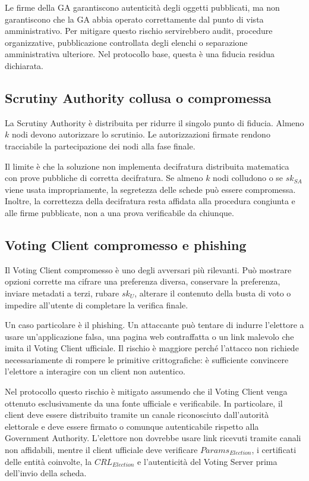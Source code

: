 \documentclass[a4paper,12pt]{article}
\begin{document}
Le firme della GA garantiscono autenticità degli oggetti pubblicati, ma non garantiscono che la GA abbia operato correttamente dal punto di vista amministrativo.
Per mitigare questo rischio servirebbero audit, procedure organizzative, pubblicazione controllata degli elenchi o separazione amministrativa ulteriore.
Nel protocollo base, questa è una fiducia residua dichiarata.

\subsection{Scrutiny Authority collusa o compromessa}

La Scrutiny Authority è distribuita per ridurre il singolo punto di fiducia.
Almeno \(k\) nodi devono autorizzare lo scrutinio.
Le autorizzazioni firmate rendono tracciabile la partecipazione dei nodi alla fase finale.

Il limite è che la soluzione non implementa decifratura distribuita matematica con prove pubbliche di corretta decifratura.
Se almeno \(k\) nodi colludono o se \(sk_{SA}\) viene usata impropriamente, la segretezza delle schede può essere compromessa.
Inoltre, la correttezza della decifratura resta affidata alla procedura congiunta e alle firme pubblicate, non a una prova verificabile da chiunque.

\subsection{Voting Client compromesso e phishing}

Il Voting Client compromesso è uno degli avversari più rilevanti.
Può mostrare opzioni corrette ma cifrare una preferenza diversa, conservare la preferenza, inviare metadati a terzi, rubare \(sk_U\), alterare il contenuto della busta di voto o impedire all'utente di completare la verifica finale.

Un caso particolare è il phishing.
Un attaccante può tentare di indurre l'elettore a usare un'applicazione falsa, una pagina web contraffatta o un link malevolo che imita il Voting Client ufficiale.
Il rischio è maggiore perché l'attacco non richiede necessariamente di rompere le primitive crittografiche: è sufficiente convincere l'elettore a interagire con un client non autentico.

Nel protocollo questo rischio è mitigato assumendo che il Voting Client venga ottenuto esclusivamente da una fonte ufficiale e verificabile.
In particolare, il client deve essere distribuito tramite un canale riconosciuto dall'autorità elettorale e deve essere firmato o comunque autenticabile rispetto alla Government Authority.
L'elettore non dovrebbe usare link ricevuti tramite canali non affidabili, mentre il client ufficiale deve verificare \(Params_{Election}\), i certificati delle entità coinvolte, la    \(CRL_{Election}\) e l'autenticità del Voting Server prima dell'invio della scheda.
\end{document}
